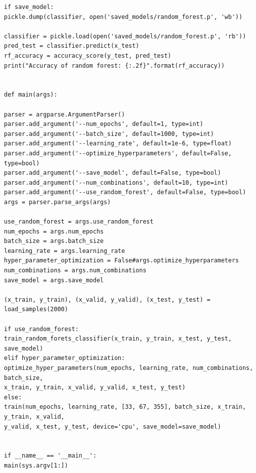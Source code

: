 \documentclass[aps,prb,10pt,twocolumn,groupedaddress]{revtex4-1}
\begin{document}
\begin{lstlisting}
if save_model:
pickle.dump(classifier, open('saved_models/random_forest.p', 'wb'))

classifier = pickle.load(open('saved_models/random_forest.p', 'rb'))
pred_test = classifier.predict(x_test)
rf_accuracy = accuracy_score(y_test, pred_test)
print("Accuracy of random forest: {:.2f}".format(rf_accuracy))


def main(args):

parser = argparse.ArgumentParser()
parser.add_argument('--num_epochs', default=1, type=int)
parser.add_argument('--batch_size', default=1000, type=int)
parser.add_argument('--learning_rate', default=1e-6, type=float)
parser.add_argument('--optimize_hyperparameters', default=False, type=bool)
parser.add_argument('--save_model', default=False, type=bool)
parser.add_argument('--num_combinations', default=10, type=int)
parser.add_argument('--use_random_forest', default=False, type=bool)
args = parser.parse_args(args)

use_random_forest = args.use_random_forest
num_epochs = args.num_epochs
batch_size = args.batch_size
learning_rate = args.learning_rate
hyper_parameter_optimization = False#args.optimize_hyperparameters
num_combinations = args.num_combinations
save_model = args.save_model

(x_train, y_train), (x_valid, y_valid), (x_test, y_test) = load_samples(2000)

if use_random_forest:
train_random_forets_classifier(x_train, y_train, x_test, y_test, save_model)
elif hyper_parameter_optimization:
optimize_hyper_parameters(num_epochs, learning_rate, num_combinations, batch_size,
x_train, y_train, x_valid, y_valid, x_test, y_test)
else:
train(num_epochs, learning_rate, [33, 67, 355], batch_size, x_train, y_train, x_valid,
y_valid, x_test, y_test, device='cpu', save_model=save_model)


if __name__ == '__main__':
main(sys.argv[1:])
\end{lstlisting}
\end{document}
